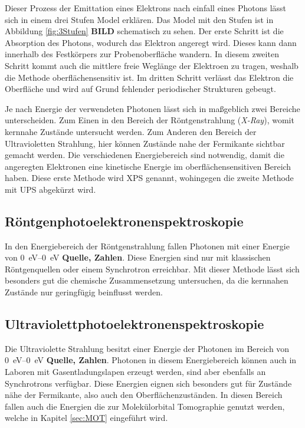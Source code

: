         Dieser Prozess der Emittation eines Elektrons nach einfall eines Photons lässt sich in einem drei Stufen Model erklären.
        Das Model mit den Stufen ist in Abbildung \ref{fig:3Stufen} \textbf{BILD} schematisch zu sehen.
        Der erste Schritt ist die Absorption des Photons, wodurch das Elektron angeregt wird. 
        Dieses kann dann innerhalb des Festkörpers zur Probenoberfläche wandern.
        In diesem zweiten Schritt kommt auch die mittlere freie Weglänge der Elektroen zu tragen, weshalb die Methode oberflächensensitiv ist.
        Im dritten Schritt verlässt das Elektron die Oberfläche und wird auf Grund fehlender periodischer Strukturen gebeugt.

        Je nach Energie der verwendeten Photonen lässt sich in maßgeblich zwei Bereiche unterscheiden.
        Zum Einen in den Bereich der Röntgenstrahlung (\textit{X-Ray}), womit kernnahe Zustände untersucht werden.
        Zum Anderen den Bereich der Ultravioletten Strahlung, hier können Zustände nahe der Fermikante sichtbar gemacht werden.
        Die verschiedenen Energiebereich sind notwendig, damit die angeregten Elektronen eine kinetische Energie im oberflächensensitiven Bereich haben.
        Diese erste Methode wird XPS genannt, wohingegen die zweite Methode mit UPS abgekürzt wird.

        \subsection{Röntgenphotoelektronenspektroskopie}
            In den Energiebereich der Röntgenstrahlung fallen Photonen mit einer Energie von \SIrange{0}{0}{\electronvolt} \textbf{Quelle, Zahlen}.
            Diese Energien sind nur mit klassischen Röntgenquellen oder einem Synchrotron erreichbar.
            Mit dieser Methode lässt sich besonders gut die chemische Zusammensetzung untersuchen, da die kernnahen Zustände nur geringfügig beinflusst werden.

        \subsection{Ultraviolettphotoelektronenspektroskopie}
            Die Ultraviolette Strahlung besitzt einer Energie der Photonen im Bereich von \SIrange{0}{0}{\electronvolt} \textbf{Quelle, Zahlen}.
            Photonen in diesem Energiebereich können auch in Laboren mit Gasentladungslapen erzeugt werden, sind aber ebenfalls an Synchrotrons verfügbar.
            Diese Energien eignen sich besonders gut für Zustände nähe der Fermikante, also auch den Oberflächenzuständen.
            In diesen Bereich fallen auch die Energien die zur Molekülorbital Tomographie genutzt werden, welche in Kapitel \ref{sec:MOT} eingeführt wird.

